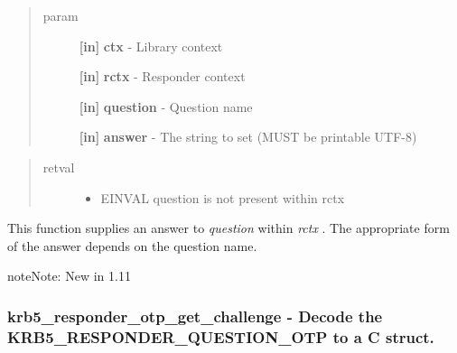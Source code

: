 \documentclass[letterpaper,10pt,english]{sphinxmanual}
\begin{document}
\begin{quote}\begin{description}
\item[{param}] \leavevmode
\textbf{{[}in{]}} \textbf{ctx} - Library context

\textbf{{[}in{]}} \textbf{rctx} - Responder context

\textbf{{[}in{]}} \textbf{question} - Question name

\textbf{{[}in{]}} \textbf{answer} - The string to set (MUST be printable UTF-8)

\end{description}\end{quote}
\begin{quote}\begin{description}
\item[{retval}] \leavevmode\begin{itemize}
\item {} 
EINVAL    question is not present within rctx

\end{itemize}

\end{description}\end{quote}

This function supplies an answer to \emph{question} within \emph{rctx} . The appropriate form of the answer depends on the question name.

\begin{notice}{note}{Note:}
New in 1.11
\end{notice}


\subsubsection{krb5\_responder\_otp\_get\_challenge -  Decode the KRB5\_RESPONDER\_QUESTION\_OTP to a C struct.}
\label{appdev/refs/api/krb5_responder_otp_get_challenge:krb5-responder-otp-get-challenge-decode-the-krb5-responder-question-otp-to-a-c-struct}\label{appdev/refs/api/krb5_responder_otp_get_challenge::doc}

\begin{fulllineitems}
\label{appdev/refs/api/krb5_responder_otp_get_challenge:krb5_responder_otp_get_challenge}
\end{fulllineitems}
\end{document}
